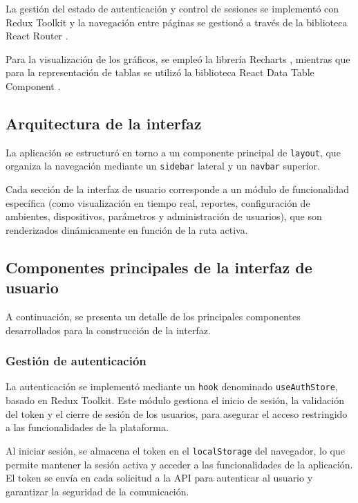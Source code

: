 La gestión del estado de autenticación y control de sesiones se implementó con
Redux Toolkit \cite{ReduxToolkit} y la navegación entre páginas se gestionó a
través de la biblioteca React Router \cite{ReactRouter}.

Para la visualización de los gráficos, se empleó la librería Recharts
\cite{Recharts}, mientras que para la representación de tablas se utilizó la
biblioteca React Data Table Component \cite{ReactDataTable}.

\subsection{Arquitectura de la interfaz}

La aplicación se estructuró en torno a un componente principal de
\texttt{layout}, que organiza la navegación mediante un \texttt{sidebar}
lateral y un \texttt{navbar} superior.

Cada sección de la interfaz de usuario corresponde a un módulo de funcionalidad
específica (como visualización en tiempo real, reportes, configuración de
ambientes, dispositivos, parámetros y administración de usuarios), que son
renderizados dinámicamente en función de la ruta activa.

\subsection{Componentes principales de la interfaz de usuario}

A continuación, se presenta un detalle de los principales componentes
desarrollados para la construcción de la interfaz.

\subsubsection{Gestión de autenticación}

La autenticación se implementó mediante un \texttt{hook} denominado
\texttt{useAuthStore}, basado en Redux Toolkit. Este módulo gestiona el inicio
de sesión, la validación del token y el cierre de sesión de los usuarios, para
asegurar el acceso restringido a las funcionalidades de la plataforma.

Al iniciar sesión, se almacena el token en el \texttt{localStorage} del
navegador, lo que permite mantener la sesión activa y acceder a las
funcionalidades de la aplicación. El token se envía en cada solicitud a la API
para autenticar al usuario y garantizar la seguridad de la comunicación.

